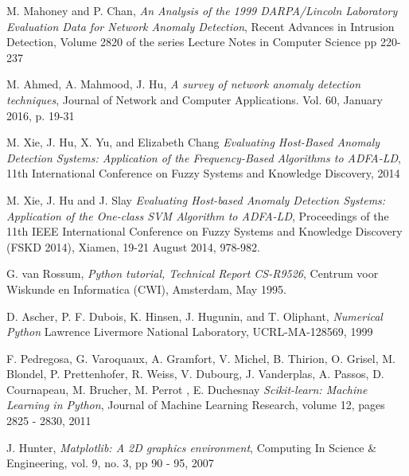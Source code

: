 \documentclass[reqno,openany,12pt]{amsbook}
\begin{document}
\begin{thebibliography}{99}
 M. Mahoney and P. Chan, \emph{An Analysis of the 1999 DARPA/Lincoln Laboratory Evaluation Data for Network Anomaly Detection}, Recent Advances in Intrusion Detection,  Volume 2820 of the series Lecture Notes in Computer Science pp 220-237

 M. Ahmed, A. Mahmood, J. Hu, \emph{A survey of network anomaly detection techniques}, Journal of Network and Computer Applications. Vol. 60, January 2016, p. 19-31

 M. Xie, J. Hu, X. Yu, and Elizabeth Chang \emph{Evaluating Host-Based Anomaly Detection Systems: Application of the Frequency-Based Algorithms to ADFA-LD}, 11th International Conference on Fuzzy Systems and Knowledge Discovery, 2014

 M. Xie, J. Hu and J. Slay \emph{Evaluating Host-based Anomaly Detection Systems:
Application of the One-class SVM Algorithm to ADFA-LD}, Proceedings of the 11th IEEE International Conference on Fuzzy Systems and Knowledge Discovery (FSKD 2014), Xiamen, 19-21 August 2014, 978-982. 

 G. van Rossum, \emph{Python tutorial, Technical Report CS-R9526}, Centrum voor Wiskunde en Informatica (CWI), Amsterdam, May 1995.

 D. Ascher, P. F. Dubois, K. Hinsen, J. Hugunin, and T. Oliphant,
\emph{Numerical Python} Lawrence Livermore National Laboratory, UCRL-MA-128569, 1999

 F. Pedregosa, G. Varoquaux, A. Gramfort, V. Michel, B. Thirion, O. Grisel, M. Blondel, P. Prettenhofer, R. Weiss, V. Dubourg, J. Vanderplas, A. Passos, D. Cournapeau, M. Brucher, M. Perrot , E. Duchesnay 
\emph{Scikit-learn: Machine Learning in Python}, Journal of Machine Learning Research, volume 12,
 pages 2825 - 2830, 2011

J. Hunter, \emph{Matplotlib: A 2D graphics environment}, Computing In Science \& Engineering, vol. 9, no. 3, pp 90 - 95, 2007



\end{thebibliography}
\end{document}
